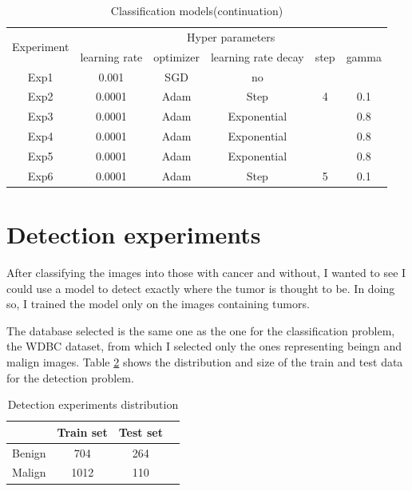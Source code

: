 \begin{table}[H]
    \centering
    \begin{tabular}{|c|c|c|c|c|c|}
        \hline
        \multirow{2}{5em}{Experiment}  & \multicolumn{5}{c|}{Hyper parameters} \\ \cline{2-6}
         & learning rate & optimizer & learning rate decay & step & gamma \\
        \hline \hline
        Exp1 & 0.001 & SGD & no &  &   \\
        \hline
        Exp2 & 0.0001 & Adam & Step & 4 & 0.1 \\
        \hline
        Exp3 & 0.0001 & Adam & Exponential & & 0.8\\
        \hline
        Exp4 & 0.0001 & Adam & Exponential & & 0.8\\
        \hline
        Exp5 & 0.0001 & Adam & Exponential & & 0.8\\
        \hline 
        Exp6 & 0.0001 & Adam & Step & 5 & 0.1\\
        \hline
    \end{tabular}
    \caption{Classification models(continuation)}
    \label{tab:tab5}
\end{table}

\section{Detection experiments}

After classifying the images into those with cancer and without, I wanted to see I could use a model to detect exactly where the tumor is thought to be. In doing so, I trained the model only on the images containing tumors.

The database selected is the same one as the one for the classification problem, the WDBC dataset, from which I selected only the ones representing beingn and malign images. Table \ref{tab:tab6} shows the distribution and size of the train and test data for the detection problem.

\begin{table}[ht!]
\centering
\begin{tabular}{|c|c|c|c|}
    \hline
     & Train set & Test set \\ \hline
    Benign & 704 & 264 \\ \hline
    Malign & 1012 & 110\\ \hline
    \end{tabular}
    \caption{Detection experiments distribution}
    \label{tab:tab6}
\end{table}

